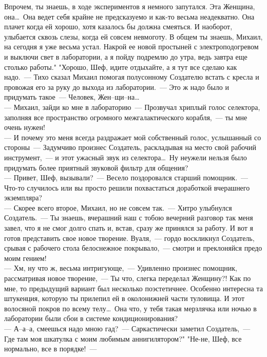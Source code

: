 Впрочем, ты знаешь, в ходе экспериментов я немного запутался. Эта 
Женщина, она\ldots\ Она ведет себя крайне не предсказуемо и как-то весьма 
неадекватно. Она плачет когда ей хорошо, хотя казалось бы должна 
смеяться. И наоборот, улыбается сквозь слезы, когда ей совсем невмоготу.
В общем ты знаешь, Михаил, на сегодня я уже весьма устал. Накрой ее 
новой простыней с электроподогревом и выключи свет в лаборатории, а я 
пойду подремлю до утра, ведь завтра еще столько работы."  "Хорошо, Шеф, 
идите отдыхайте, а я тут все сделаю как надо.~--- Тихо сказал Михаил 
помогая полусонному Создателю встать с кресла и провожая его за руку до 
выхода из лаборатории.~--- Это ж надо было и придумать такое~--- Человек, 
Жен--щи--на\ldots\\
--- Михаил, зайди ко мне в лабораторию~--- Прозвучал хриплый голос 
селектора, заполняя все пространство огромного межгалактического 
корабля,~--- ты мне очень нужен!\\
--- И почему это меня всегда раздражает мой
собственный голос, услышанный со стороны~--- Задумчиво произнес 
Создатель, раскладывая на место свой рабочий инструмент,~--- и этот 
ужасный звук из селектора\ldots\ Ну неужели нельзя было придумать более 
приятный звуковой фильтр для общения?\\ 
--- Привет, Шеф, вызывали?~--- Весело 
поздоровался старший помощник.~--- Что-то случилось или вы просто решили 
похвастаться доработкой вчерашнего экземпляра?\\ 
--- Скорее всего второе, 
Михаил, но не совсем так.~--- Хитро улыбнулся Создатель.~--- Ты знаешь, 
вчерашний наш с тобою вечерний разговор так меня завел, что я не смог 
долго спать и, встав, сразу же принялся за работу. И вот я готов 
представить свое новое творение. Вуаля,~--- гордо воскликнул Создатель, 
срывая с рабочего стола белоснежное покрывало,~--- смотри и преклоняйся 
предо моим гением!\\
--- Хм, ну что ж, весьма интригующе,~--- Удивленно произнес помощник, 
рассматривая новое творение,~--- Ты что, слегка переделал Женщину?! Как по
мне, то предыдущий вариант был несколько поэстетичнее. Особенно 
интересна та штукенция, которую ты прилепил ей в околонижней части 
туловища. И этот волосяной покров по всему телу\ldots\ Она что, у тебя такая
мерзлячка или ночью в лаборатории были сбои в системе 
кондиционирования?\\
--- А--а--а, смеешься надо мною гад?~--- Саркастически 
заметил Создатель,~--- Где там моя шкатулка с моим любимым 
аннигилятором?"  "Не-не, Шеф, все нормально, все в порядке!~--- 
